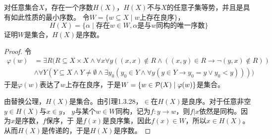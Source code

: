 \documentclass[11pt]{article}
\begin{document}
\begin{exercise}[1.5.38]
对任意集合\(X\)，存在一个序数\(H(X)\)，\(H(X)\)不与\(X\)的任意子集等势，并且是具有如此性质的最小序数。
令\(W=\{w\subseteq X\mid w\text{上存在良序}\}\)，
\begin{equation*}
H(X)=\{\alpha\mid\text{存在}w\in W,\alpha\text{是与$w$同构的唯一序数}\}
\end{equation*}
证明\(W\)是集合，\(H(X)\)是序数。
\end{exercise}

\begin{proof}
令
\begin{align*}
\varphi(w)&=\exists R(R\subseteq X\times X\wedge\forall x\forall y((x,x)\notin R\wedge((x,y)\in R\to\neg(y,x)\notin R))\\&\wedge\forall Y(Y\subseteq X\wedge Y\neq\emptyset\wedge\exists y_0(y_0\in Y\wedge\forall y(y\in Y\to y_0=y\vee y_0<y))))
\end{align*}
于是\(\varphi(w)\)表达了\(w\)上存在良序，于是\(W=\{w\in\mathcal{P}(X)\mid\varphi(w)\}\)是集合。

由替换公理，\(H(X)\)是集合。由引理1.3.28，\(\in\)在\(H(X)\)是良序。对于任意非空\(y\in H(X)\)与\(x\in y\)，
\(y\)与某个\(w\in W\)同构，记为\(f:y\to w\)，则\(f|x\)依然是同构。因为\(x\)是序数，\(f\)保序，于
是\(f(x)\)是良序集，因此\(f(x)\in W\)，所以\(x\in H(X)\)。从而\(H(X)\)是传递的，于是\(H(X)\)是序数。
\end{proof}
\end{document}
